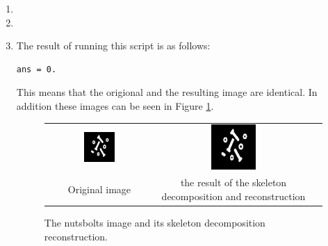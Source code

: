 \documentclass[a4paper]{article}
\begin{document}
\begin{enumerate}
\begin{proof}
\begin{align*}
          &= \left(X - \{z | (\hat{B})_{z} \cap \emptyset \neq \emptyset\}\right) \cup \bigcup_{k = 1}^K \left(\emptyset - \{z | (\hat{B})_{z} \cap \emptyset \neq \emptyset\}\right) \\
          &= \left(X - \{z | \emptyset \neq \emptyset\}\right) \cup \bigcup_{k = 1}^K \left(\emptyset - \{z | \emptyset \neq \emptyset\}\right) \\
          &= \left(X - \emptyset \right) \cup \bigcup_{k = 1}^K \left(\emptyset - \emptyset\right) \\
          &= X \cup \bigcup_{k = 1}^K \emptyset \\
          &= X \cup \emptyset \\
          &= X 
\end{align*}
\end{proof}
\item



\item

\item

The result of running this script is as follows:
\begin{lstlisting}
ans = 0.
\end{lstlisting}
This means that the origional and the resulting image are identical.
In addition these images can be seen in Figure \ref{fig:nutsbolts}.
\begin{figure}[H]
\centering
\begin{tabular}{ccc}
    \includegraphics[width=0.3\textwidth]{../lab4ex1/nutsbolts.png} & \includegraphics[width=0.3\textwidth]{../lab4ex1/recon.png}  & \\
    Original image & the result of the skeleton decomposition and reconstruction \\
\end{tabular}
\caption{The nutsbolts image and its skeleton decomposition reconstruction.}
\label{fig:nutsbolts}
\end{figure}
\end{enumerate}
\end{document}
